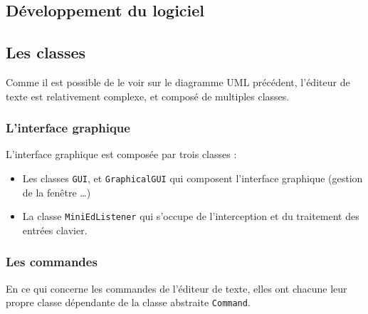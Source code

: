 \documentclass[a4paper]{article}
\begin{document}

	\begin{center}
		\section{Développement du logiciel}
	\end{center}

	\vspace{0.5cm}

		\subsection{Les classes}

		\vspace{0.5cm}

		Comme il est possible de le voir sur le diagramme UML précédent, l'éditeur de texte est relativement complexe, et composé de multiples classes. 

		\vspace{0.5cm}

			\subsubsection{L'interface graphique}

			L'interface graphique est composée par trois classes :

			\begin{itemize}
				\item Les classes \texttt{GUI}, et \texttt{GraphicalGUI} qui composent l'interface graphique (gestion de la fenêtre \dots)

				\item La classe \texttt{MiniEdListener} qui s'occupe de l'interception et du traitement des entrées clavier.
			\end{itemize}

			\subsubsection{Les commandes}

			En ce qui concerne les commandes de l'éditeur de texte, elles ont chacune leur propre classe dépendante de la classe abstraite \texttt{Command}.
\end{document}
